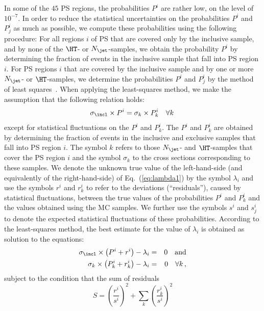 In some of the $45$ PS regions, the probabilities $P^{i}$ are rather low, on the level of $10^{-7}$.
In order to reduce the statistical uncertainties on the probabilities $P^{i}$ and $P_{j}^{i}$ as much as possible,
we compute these probabilities using the following procedure:
For all regions $i$ of PS that are covered only by the inclusive sample, and by none of the $\HT$- or $N_{\jet}$-samples,
we obtain the probability $P^{i}$ by determining the fraction of events in the inclusive sample that fall into PS region $i$.
For PS regions $i$ that are covered by the inclusive sample and by one or more $N_{\jet}$- or $\HT$-samples,
we determine the probabilities $P^{i}$ and $P_{j}^{i}$ by the method of least squares~\cite{Cowan:1998ji}.
When applying the least-squares method, we make the assumption that the following relation holds:
\begin{equation}
\sigma_{\incl} \times P^{i} = \sigma_{k} \times P_{k}^{i} \quad \forall k \,
\label{eq:lambda1}
\end{equation}
except for statistical fluctuations on the $P^{i}$ and $P_{k}^{i}$.
The $P^{i}$ and $P_{k}^{i}$ are obtained by determining the fraction of events in the inclusive and exclusive samples that fall into PS region $i$.
The symbol $k$ refers to those $N_{\jet}$- and $\HT$-samples that cover the PS region $i$
and the symbol $\sigma_{k}$ to the cross sections corresponding to these samples.
We denote the unknown true value of the left-hand-side (and equivalently of the right-hand-side) of Eq.~(\ref{eq:lambda1}) by the symbol $\lambda_{i}$
and use the symbols $r^{i}$ and $r_{k}^{i}$ to refer to the deviations (``residuals''), caused by statistical fluctuations,
between the true values of the probabilities $P^{i}$ and $P_{k}^{i}$ and the values obtained using the MC samples.
We further use the symbols $s^{i}$ and $s_{j}^{i}$ to denote the expected statistical fluctuations of these probabilities.
According to the least-squares method,
the best estimate for the value of $\lambda_{i}$ is obtained as solution to the equations:
\begin{eqnarray*}
\sigma_{\incl} \times \left( P^{i} + r^{i} \right) - \lambda_{i} & = & 0 \quad \mbox{and} \\
\sigma_{k} \times \left( P_{k}^{i} + r_{k}^{i} \right) - \lambda_{i} & = & 0 \quad \forall k \, ,
\end{eqnarray*}
subject to the condition that the sum of residuals
\begin{equation*}
S = \left( \frac{r^{i}}{s^{i}} \right)^{2} + \sum_{k} \left( \frac{r_{k}^{i}}{s^{i}} \right)^{2}
\end{equation*}
